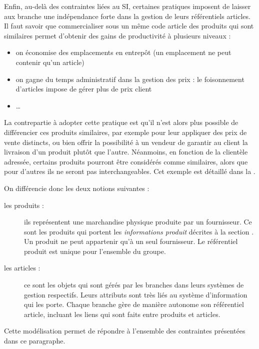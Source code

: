             Enfin, au-delà des contraintes liées au SI, certaines pratiques imposent de laisser aux branche une indépendance forte dans la gestion de leurs référentiels articles.
            Il faut savoir que commercialiser sous un même code article des produits qui sont similaires permet d'obtenir des gains de productivité à plusieurs niveaux :
            \begin{itemize}
                \item on économise des emplacements en entrepôt (un emplacement ne peut contenir qu'un article)
                \item on gagne du temps administratif dans la gestion des prix : le foisonnement d'articles impose de gérer plus de prix client
                \item \dots
            \end{itemize}
            La contrepartie à adopter cette pratique est qu'il n'est alors plus possible de différencier ces produits similaires, par exemple pour leur appliquer des prix de vente distincts, ou bien offrir la possibilité à un vendeur de garantir au client la livraison d'un produit plutôt que l'autre.
            Néanmoins, en fonction de la clientèle adressée, certains produits pourront être considérés comme similaires, alors que pour d'autres ils ne seront pas interchangeables.
            Cet exemple est détaillé dans la .

            On différencie donc les deux notions suivantes : 
            \begin{description}
                \item[les produits :] ils représentent une marchandise physique produite par un fournisseur. Ce sont les produits qui portent les \emph{informations produit} décrites à la section . Un produit ne peut appartenir qu'à un seul fournisseur. Le référentiel produit est unique pour l'ensemble du groupe.
                \item[les articles :] ce sont les objets qui sont gérés par les branches dans leurs systèmes de gestion respectifs. Leurs attributs sont très liés au système d'information qui les porte. Chaque branche gère de manière autonome son référentiel article, incluant les liens qui sont faits entre produits et articles.
            \end{description}
            Cette modélisation permet de répondre à l'ensemble des contraintes présentées dans ce paragraphe.

